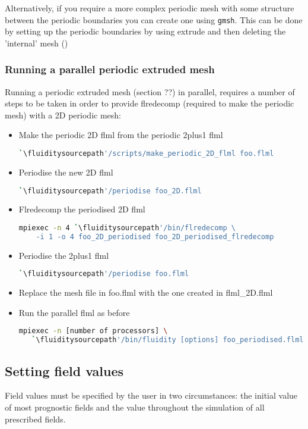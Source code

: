 Alternatively, if you require a more complex periodic mesh with some structure between the periodic 
boundaries you can create one using \lstinline[language=Bash]{gmsh}. This can be done by 
setting up the periodic boundaries by using extrude and then deleting the 'internal' mesh (\website)

\subsubsection{Running a parallel periodic extruded mesh}
Running a periodic extruded mesh (section ??) in parallel, requires a number of steps to be taken in order to provide flredecomp (required to make the periodic mesh) with a 2D periodic mesh:

\begin{itemize}
\item Make the periodic 2D flml from the periodic 2plus1 flml
\begin{lstlisting}[language=bash]
 `\fluiditysourcepath'/scripts/make_periodic_2D_flml foo.flml
\end{lstlisting}
\item Periodise the new 2D flml
\begin{lstlisting}[language=bash]
 `\fluiditysourcepath'/periodise foo_2D.flml
\end{lstlisting}
\item Flredecomp the periodised 2D flml
\begin{lstlisting}[language=bash]
mpiexec -n 4 `\fluiditysourcepath'/bin/flredecomp \
    -i 1 -o 4 foo_2D_periodised foo_2D_periodised_flredecomp
\end{lstlisting}
\item Periodise the 2plus1 flml
\begin{lstlisting}[language=bash]
 `\fluiditysourcepath'/periodise foo.flml
\end{lstlisting}
\item Replace the mesh file in foo.flml with the one created in flml\_2D.flml
\item Run the parallel flml as before
\begin{lstlisting}[language=bash]
mpiexec -n [number of processors] \
   `\fluiditysourcepath'/bin/fluidity [options] foo_periodised.flml
\end{lstlisting}
\end{itemize}

\subsection{Setting field values}\label{Sect:setting_field_values}
\index{initial conditions!setting}
Field values must be specified by the user in two circumstances: the initial
value of most prognostic fields and the value throughout the simulation of
all prescribed fields. 

